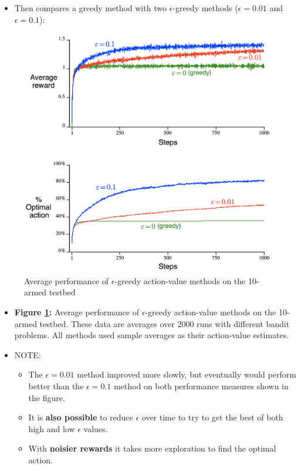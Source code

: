 \documentclass[12pt, a4paper]{article}
\begin{document}
\begin{itemize}
\item
  Then compares a greedy method with two \(\epsilon\)-greedy methods
  (\(\epsilon = 0.01\) and \(\epsilon = 0.1\)):
\end{itemize}


\begin{figure}[H]
  \centering  %
    \includegraphics[width=0.9\columnwidth]{images/10-armed-eg2.png}
    \caption{Average performance of \(\epsilon\)-greedy action-value methods on the 10-armed testbed}
    \label{fig:fig2}
\end{figure}


\begin{itemize}
\item
  \textbf{Figure \ref{fig:fig2}:} Average performance of \(\epsilon\)-greedy
  action-value methods on the 10-armed testbed. These data are averages
  over 2000 runs with different bandit problems. All methods used sample
  averages as their action-value estimates.
\end{itemize}

\begin{itemize}
\item
  NOTE:

  \begin{itemize}
  \item
    The \(\epsilon = 0.01\) method improved more slowly, but eventually
    would perform better than the \(\epsilon = 0.1\) method on both
    performance measures shown in the figure.
  \item
    It is \textbf{also possible} to reduce \(\epsilon\) over time to try
    to get the best of both high and low \(\epsilon\) values.
  \item
    With \textbf{noisier rewards} it takes more exploration to find the
    optimal action.
  \end{itemize}
\end{itemize}
\end{document}
